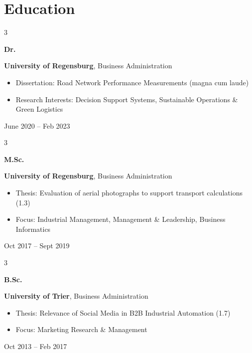 \documentclass[10pt, a4paper]{article}
\newenvironment{highlights}{
    \begin{itemize}[
        topsep=0.10 cm,
        parsep=0.10 cm,
        partopsep=0pt,
        itemsep=0pt,
        leftmargin=0.4 cm + 10pt
    ]
}{
    \end{itemize}
} %
\newenvironment{threecolentry}[3][]{
    \onecolentry
    \def\thirdColumn{#3}
    \setcolumnwidth{1 cm, \fill, 4.5 cm}
    \begin{paracol}{3}
    {\raggedright #2} \switchcolumn
}{
    \switchcolumn \raggedleft \thirdColumn
    \end{paracol}
    \endonecolentry
} %
\begin{document}
    
    \section{Education}



        
        \begin{threecolentry}{\textbf{Dr.}}{
            June 2020 – Feb 2023
        }
            \textbf{University of Regensburg}, Business Administration
            \begin{highlights}
                \item Dissertation: Road Network Performance Measurements (magna cum laude)
                \item Research Interests: Decision Support Systems, Sustainable Operations \& Green Logistics
            \end{highlights}
        \end{threecolentry}

        \vspace{0.2 cm}

        \begin{threecolentry}{\textbf{M.Sc.}}{
            Oct 2017 – Sept 2019
        }
            \textbf{University of Regensburg}, Business Administration
            \begin{highlights}
                \item Thesis: Evaluation of aerial photographs to support transport calculations (1.3)
                \item Focus: Industrial Management, Management \& Leadership, Business Informatics
            \end{highlights}
        \end{threecolentry}

        \vspace{0.2 cm}

        \begin{threecolentry}{\textbf{B.Sc.}}{
            Oct 2013 – Feb 2017
        }
            \textbf{University of Trier}, Business Administration
            \begin{highlights}
                \item Thesis: Relevance of Social Media in B2B Industrial Automation (1.7)
                \item Focus: Marketing Research \& Management
            \end{highlights}
        \end{threecolentry}
\end{document}
